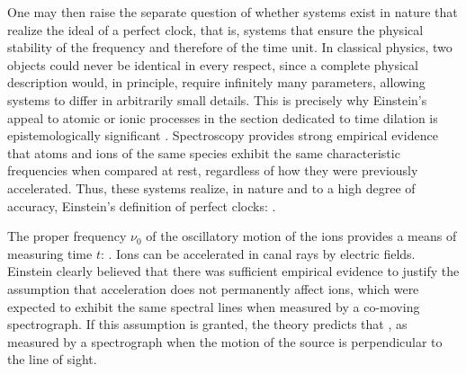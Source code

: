 \documentclass[pdflatex]{sn-jnl}
\newcommand{\me}{; my emphasis}
\begin{document}
One may then raise the separate question of whether systems exist in nature that realize the ideal of a perfect clock, that is, systems that ensure the physical stability of the frequency and therefore of the time unit. In classical physics, two objects could never be identical in every respect, since a complete physical description would, in principle, require infinitely many parameters, allowing systems to differ in arbitrarily small details. This is precisely why Einstein’s appeal to atomic or ionic processes in the section dedicated to time dilation is epistemologically significant \citep{Pierseaux2003}. Spectroscopy provides strong empirical evidence that atoms and ions of the same species exhibit the same characteristic frequencies when compared at rest, regardless of how they were previously accelerated. Thus, these systems realize, in nature and to a high degree of accuracy, Einstein’s definition of perfect clocks:  \citep[132--33]{Einstein1910}.

The proper frequency $\nu_0$ of the oscillatory motion of the ions provides a means of measuring time $t$:  \citep[133]{Einstein1910}. Ions can be accelerated in canal rays by electric fields. Einstein clearly believed that there was sufficient empirical evidence to justify the assumption that acceleration does not permanently affect ions, which were expected to exhibit the same spectral lines when measured by a co-moving spectrograph. If this assumption is granted, the theory predicts that  \citep[133\me]{Einstein1910}, as measured by a spectrograph when the motion of the source is perpendicular to the line of sight.
\end{document}

